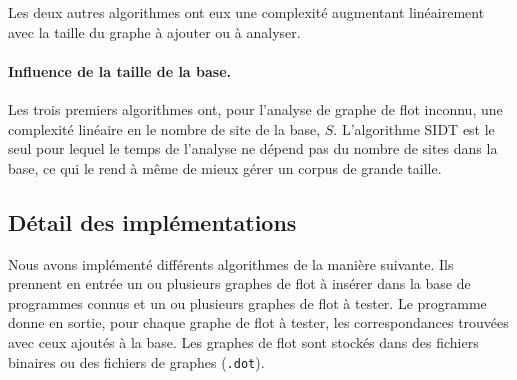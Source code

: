 Les deux autres algorithmes ont eux une complexité augmentant linéairement avec la taille du graphe à ajouter ou à analyser.

\paragraph{Influence de la taille de la base.}
Les trois premiers algorithmes ont, pour l'analyse de graphe de flot inconnu, une complexité linéaire en le nombre de site de la base, $S$.
L'algorithme SIDT est le seul pour lequel le temps de l'analyse ne dépend pas du nombre de sites dans la base, ce qui le rend à même de mieux gérer un corpus de grande taille.




\subsection{Détail des implémentations}
Nous avons implémenté différents algorithmes de la manière suivante. Ils prennent en entrée un ou plusieurs graphes de flot à insérer dans la base de programmes connus et un ou plusieurs graphes de flot à tester.
Le programme donne en sortie, pour chaque graphe de flot à tester, les correspondances trouvées avec ceux ajoutés à la base.
Les graphes de flot sont stockés dans des fichiers binaires ou des fichiers de graphes (\texttt{.dot}).

